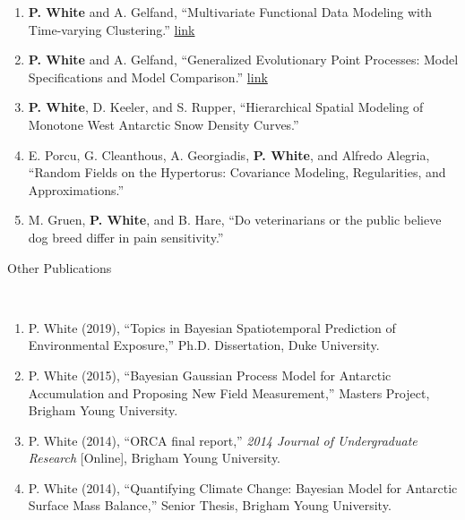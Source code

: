 \documentclass[12pt]{article}
\newcommand{\head}[1]{ %
    \bigskip %
    \begin{large}\begin{bf}{#1}\end{bf}\end{large} %

    \ \\ [-1.3cm] %

    \hrulefill}
\begin{document}
\begin{enumerate}[label=$\bullet$]
\item \textbf{P. White} and A. Gelfand, ``Multivariate Functional Data Modeling with Time-varying Clustering.'' \href{https://arxiv.org/abs/1904.11518}{link}
\item \textbf{P. White} and A. Gelfand, ``Generalized Evolutionary Point Processes: Model Specifications and Model Comparison.''  \href{https://arxiv.org/abs/1910.06897}{link}
\item \textbf{P. White}, D. Keeler, and S. Rupper, ``Hierarchical Spatial Modeling of Monotone West Antarctic Snow Density Curves.''
\item E. Porcu, G. Cleanthous, A. Georgiadis, \textbf{P. White}, and  Alfredo Alegria, ``Random Fields on the Hypertorus: Covariance Modeling, Regularities, and Approximations.'' 
\item M. Gruen, \textbf{P. White}, and B. Hare, ``Do veterinarians or the public believe dog breed differ in pain sensitivity.''
\end{enumerate}


%


\head{Other Publications}

\begin{enumerate}[label=$\bullet$]
\item P. White (2019), ``Topics in Bayesian Spatiotemporal Prediction of Environmental Exposure,'' Ph.D. Dissertation, Duke University.
\item P. White (2015), ``Bayesian Gaussian Process Model for Antarctic Accumulation and Proposing New Field Measurement,'' Masters Project, Brigham Young University.
\item P. White (2014), ``ORCA final report,'' \emph{2014 Journal of Undergraduate Research} [Online], Brigham Young University.
\item P. White (2014), ``Quantifying Climate Change: Bayesian Model for Antarctic Surface Mass Balance,'' Senior Thesis, Brigham Young University.
\end{enumerate}
\end{document}
